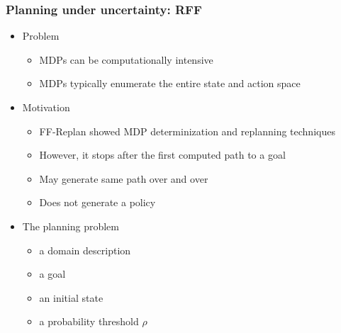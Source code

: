 \documentclass{beamer}
\let\origframetitle=\frametitle
\renewcommand\frametitle[1]{\origframetitle{\textbf{\large{\textrm{#1}}}}}
\begin{document}
\begin{frame}
  \frametitle{Planning under uncertainty: RFF}

  \begin{itemize}
    \item Problem
      \begin{itemize}
        \item MDPs can be computationally intensive
        \item MDPs typically enumerate the entire state and action space
      \end{itemize}
    \item Motivation
      \begin{itemize}
        \item FF-Replan showed MDP determinization and replanning techniques
        \item However, it stops after the first computed path to a goal
        \item May generate same path over and over
        \item Does not generate a policy
      \end{itemize}
    \item The planning problem
      \begin{itemize}
        \item a domain description
        \item a goal
        \item an initial state
        \item a probability threshold $\rho$
      \end{itemize}
  \end{itemize}

\end{frame}
\end{document}
